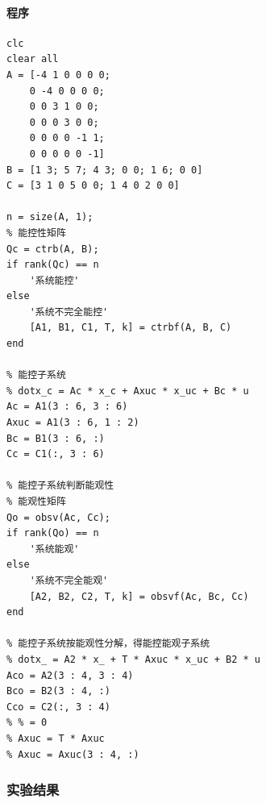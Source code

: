 \documentclass[UTF8]{article}
\begin{document}
\paragraph{程序}
\begin{lstlisting}
clc
clear all
A = [-4 1 0 0 0 0; 
    0 -4 0 0 0 0;
    0 0 3 1 0 0;
    0 0 0 3 0 0;
    0 0 0 0 -1 1;
    0 0 0 0 0 -1]
B = [1 3; 5 7; 4 3; 0 0; 1 6; 0 0]
C = [3 1 0 5 0 0; 1 4 0 2 0 0]

n = size(A, 1);
% 能控性矩阵
Qc = ctrb(A, B);
if rank(Qc) == n
    '系统能控'
else
    '系统不完全能控'
    [A1, B1, C1, T, k] = ctrbf(A, B, C)
end

% 能控子系统
% dotx_c = Ac * x_c + Axuc * x_uc + Bc * u
Ac = A1(3 : 6, 3 : 6)
Axuc = A1(3 : 6, 1 : 2)
Bc = B1(3 : 6, :)
Cc = C1(:, 3 : 6)

% 能控子系统判断能观性
% 能观性矩阵
Qo = obsv(Ac, Cc);
if rank(Qo) == n
    '系统能观'
else
    '系统不完全能观'
    [A2, B2, C2, T, k] = obsvf(Ac, Bc, Cc)
end

% 能控子系统按能观性分解，得能控能观子系统
% dotx_ = A2 * x_ + T * Axuc * x_uc + B2 * u
Aco = A2(3 : 4, 3 : 4)
Bco = B2(3 : 4, :)
Cco = C2(:, 3 : 4)
% % = 0
% Axuc = T * Axuc
% Axuc = Axuc(3 : 4, :)
\end{lstlisting}

\subsubsection{实验结果}
\end{document}
